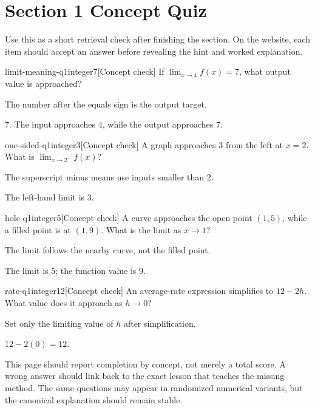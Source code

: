 \section*{Section 1 Concept Quiz}

Use this as a short retrieval check after finishing the section. On the website, each item should accept an answer before revealing the hint and worked explanation.

\begin{bgcheck}{limit-meaning-q1}{integer}{7}[Concept check]
If \(\lim_{x\to 4}f(x)=7\), what output value is approached?
\begin{bghint}
The number after the equals sign is the output target.
\end{bghint}
\begin{bgreveal}
\(7\). The input approaches \(4\), while the output approaches \(7\).
\end{bgreveal}
\end{bgcheck}

\begin{bgcheck}{one-sided-q1}{integer}{3}[Concept check]
A graph approaches \(3\) from the left at \(x=2\). What is \(\lim_{x\to2^-}f(x)\)?
\begin{bghint}
The superscript minus means use inputs smaller than \(2\).
\end{bghint}
\begin{bgreveal}
The left-hand limit is \(3\).
\end{bgreveal}
\end{bgcheck}

\begin{bgcheck}{hole-q1}{integer}{5}[Concept check]
A curve approaches the open point \((1,5)\), while a filled point is at \((1,9)\). What is the limit as \(x\to1\)?
\begin{bghint}
The limit follows the nearby curve, not the filled point.
\end{bghint}
\begin{bgreveal}
The limit is \(5\); the function value is \(9\).
\end{bgreveal}
\end{bgcheck}

\begin{bgcheck}{rate-q1}{integer}{12}[Concept check]
An average-rate expression simplifies to \(12-2h\). What value does it approach as \(h\to0\)?
\begin{bghint}
Set only the limiting value of \(h\) after simplification.
\end{bghint}
\begin{bgreveal}
\(12-2(0)=12\).
\end{bgreveal}
\end{bgcheck}

\begin{bgsummary}[title={Quiz use on the website}]
This page should report completion by concept, not merely a total score. A wrong answer should link back to the exact lesson that teaches the missing method. The same questions may appear in randomized numerical variants, but the canonical explanation should remain stable.
\end{bgsummary}

